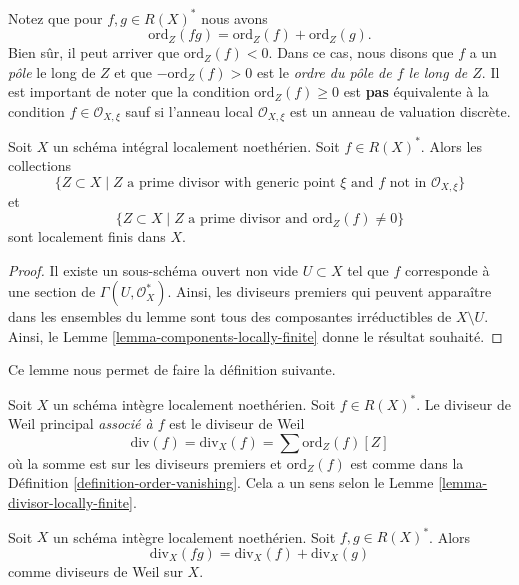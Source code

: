 \noindent
Notez que pour  $f, g \in R(X)^*$  nous avons
$$
\text{ord}_Z(fg) = \text{ord}_Z(f) + \text{ord}_Z(g).
$$
Bien sûr, il peut arriver que  $\text{ord}_Z(f) < 0$. Dans ce cas, nous disons que
 $f$  a un  {\it  pôle}  le long de
 $Z$  et que  $-\text{ord}_Z(f) > 0$  est le  {\it  ordre du pôle de
 $f$  le long de  $Z$}. Il est important de noter que la
condition  $\text{ord}_Z(f) \geq 0$  est  {\bf  pas}  équivalente à
la condition  $f \in \mathcal{O}_{X, \xi}$  sauf si l’anneau local  $\mathcal{O}_{X, \xi}$  est un anneau de
valuation discrète.

\begin{lemma}
\label{lemma-divisor-locally-finite}
Soit  $X$  un schéma intégral localement noethérien. Soit  $f \in R(X)^*$.
Alors les collections
$$
\{Z \subset X \mid Z\text{ a prime divisor with generic point }\xi
\text{ and }f\text{ not in }\mathcal{O}_{X, \xi}\}
$$
et
$$
\{Z \subset X \mid Z \text{ a prime divisor and }\text{ord}_Z(f) \not = 0\}
$$
sont localement finis dans  $X$.
\end{lemma}

\begin{proof}
Il existe un sous-schéma ouvert non vide  $U \subset X$  tel que  $f$ 
corresponde à une section de  $\Gamma(U, \mathcal{O}_X^*)$. Ainsi, les diviseurs premiers qui
peuvent apparaître dans les ensembles du lemme sont tous des composantes
irréductibles de  $X \setminus U$. Ainsi, le Lemme  \ref{lemma-components-locally-finite}  donne le résultat
souhaité.
\end{proof}

\noindent
Ce lemme nous permet de faire la définition suivante.

\begin{definition}
\label{definition-principal-divisor}
Soit  $X$  un schéma intègre localement noethérien. Soit  $f \in R(X)^*$. Le
diviseur de Weil principal  {\it  associé à
 $f$}  est le diviseur de Weil
$$
\text{div}(f) = \text{div}_X(f) = \sum \text{ord}_Z(f) [Z]
$$
où la somme est sur les diviseurs premiers et  $\text{ord}_Z(f)$  est comme dans la
Définition  \ref{definition-order-vanishing}. Cela a un sens selon le Lemme  \ref{lemma-divisor-locally-finite}.
\end{definition}

\begin{lemma}
\label{lemma-div-additive}
Soit  $X$  un schéma intègre localement noethérien. Soit  $f, g \in R(X)^*$.
Alors
$$
\text{div}_X(fg) = \text{div}_X(f) + \text{div}_X(g)
$$
comme diviseurs de Weil sur  $X$.
\end{lemma}

